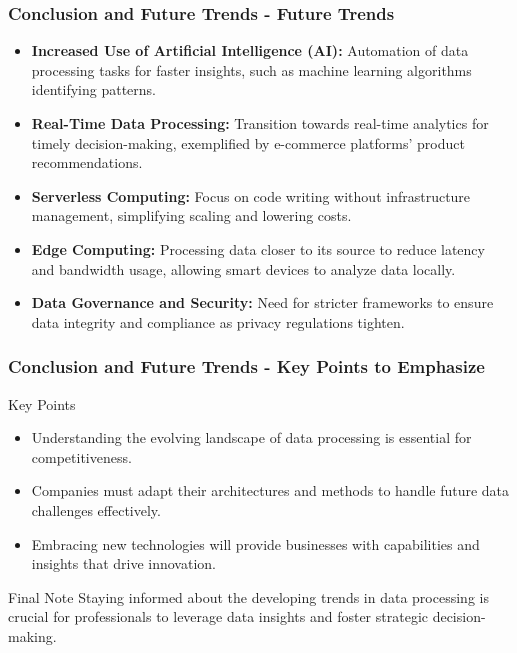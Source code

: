 \documentclass[aspectratio=169]{beamer}
\begin{document}
\begin{frame}[fragile]
    \frametitle{Conclusion and Future Trends - Future Trends}

    \begin{itemize}
        \item \textbf{Increased Use of Artificial Intelligence (AI):} Automation of data processing tasks for faster insights, such as machine learning algorithms identifying patterns.
        
        \item \textbf{Real-Time Data Processing:} Transition towards real-time analytics for timely decision-making, exemplified by e-commerce platforms' product recommendations.
        
        \item \textbf{Serverless Computing:} Focus on code writing without infrastructure management, simplifying scaling and lowering costs.
        
        \item \textbf{Edge Computing:} Processing data closer to its source to reduce latency and bandwidth usage, allowing smart devices to analyze data locally.
        
        \item \textbf{Data Governance and Security:} Need for stricter frameworks to ensure data integrity and compliance as privacy regulations tighten.
    \end{itemize}
\end{frame}

\begin{frame}[fragile]
    \frametitle{Conclusion and Future Trends - Key Points to Emphasize}

    \begin{block}{Key Points}
        \begin{itemize}
            \item Understanding the evolving landscape of data processing is essential for competitiveness.
            \item Companies must adapt their architectures and methods to handle future data challenges effectively.
            \item Embracing new technologies will provide businesses with capabilities and insights that drive innovation.
        \end{itemize}
    \end{block}

    \begin{block}{Final Note}
        Staying informed about the developing trends in data processing is crucial for professionals to leverage data insights and foster strategic decision-making.
    \end{block}
\end{frame}
\end{document}
